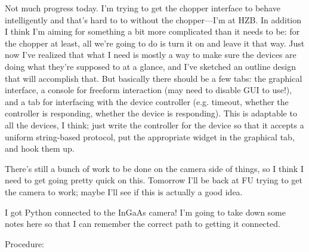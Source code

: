 \documentclass[11pt]{labbook}
\begin{document}

Not much progress today. I'm trying to get the chopper interface to behave intelligently and that's hard to to without the chopper---I'm at HZB. In addition I think I'm aiming for something a bit more complicated than it needs to be: for the chopper at least, all we're going to do is turn it on and leave it that way. Just now I've realized that what I need is mostly a way to make sure the devices are doing what they're supposed to at a glance, and I've sketched an outline design that will accomplish that. But basically there should be a few tabs: the graphical interface, a console for freeform interaction (may need to disable GUI to use!), and a tab for interfacing with the device controller (e.g. timeout, whether the controller is responding, whether the device is responding). This is adaptable to all the devices, I think; just write the controller for the device so that it accepts a uniform string-based protocol, put the appropriate widget in the graphical tab, and hook them up.

There's still a bunch of work to be done on the camera side of things, so I think I need to get going pretty quick on this. Tomorrow I'll be back at FU trying to get the camera to work; maybe I'll see if this is actually a good idea.


I got Python connected to the InGaAs camera! I'm going to take down some notes here so that I can remember the correct path to getting it connected.

Procedure:
\end{document}

